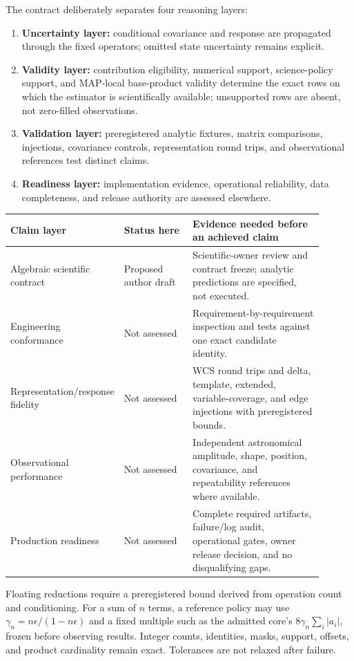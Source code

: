 \documentclass[10pt]{article}
\newcommand{\ClaimNo}{\textcolor{MapGray}{Not assessed}}
\begin{document}
The contract deliberately separates four reasoning layers:

\begin{enumerate}
\item \textbf{Uncertainty layer:} conditional covariance and response are
propagated through the fixed operators; omitted state uncertainty remains
explicit.
\item \textbf{Validity layer:} contribution eligibility, numerical support,
science-policy support, and MAP-local base-product validity determine the exact rows on
which the estimator is scientifically available; unsupported rows are absent,
not zero-filled observations.
\item \textbf{Validation layer:} preregistered analytic fixtures, matrix
comparisons, injections, covariance controls, representation round trips, and
observational references test distinct claims.
\item \textbf{Readiness layer:} implementation evidence, operational
reliability, data completeness, and release authority are assessed elsewhere.
\end{enumerate}

\begin{longtable}{L{0.26\linewidth}L{0.22\linewidth}L{0.42\linewidth}}
\toprule
Claim layer & Status here & Evidence needed before an achieved claim\\
\midrule
Algebraic scientific contract & Proposed author draft & Scientific-owner
review and contract freeze; analytic predictions are specified, not executed.\\
Engineering conformance & \ClaimNo & Requirement-by-requirement inspection and
tests against one exact candidate identity.\\
Representation/response fidelity & \ClaimNo & WCS round trips and delta,
template, extended, variable-coverage, and edge injections with preregistered
bounds.\\
Observational performance & \ClaimNo & Independent astronomical amplitude,
shape, position, covariance, and repeatability references where available.\\
Production readiness & \ClaimNo & Complete required artifacts, failure/log
audit, operational gates, owner release decision, and no disqualifying gaps.\\
\bottomrule
\end{longtable}

Floating reductions require a preregistered bound derived from operation count
and conditioning. For a sum of \(n\) terms, a reference policy may use
\(\gamma_n=n\epsilon/(1-n\epsilon)\) and a fixed multiple such as the admitted
core's \(8\gamma_n\sum_i|a_i|\), frozen before observing results. Integer
counts, identities, masks, support, offsets, and product cardinality remain
exact. Tolerances are not relaxed after failure.
\end{document}
